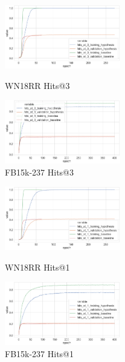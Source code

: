 \begin{figure}[H]
	\parbox{.5\linewidth}{
   		\centering
    		\includegraphics[width=0.45\textwidth, height=0.2\textheight]{WN18RR_hits_at_3_Results}
		\caption{WN18RR Hits@3}
		}
	\hfill
	\parbox{.5\linewidth}{
   		\centering
		\includegraphics[width=0.45\textwidth, height=0.2\textheight]{FB15k-237_hits_at_3_Results}
		\caption{FB15k-237 Hits@3}
		}
\end{figure}


\begin{figure}[H]
	\parbox{.5\linewidth}{
   		\centering
    		\includegraphics[width=0.45\textwidth, height=0.2\textheight]{WN18RR_hits_at_1_Results}
		\caption{WN18RR Hits@1}
		}
	\hfill
	\parbox{.5\linewidth}{
   		\centering
		\includegraphics[width=0.45\textwidth, height=0.2\textheight]{FB15k-237_hits_at_1_Results}
		\caption{FB15k-237 Hits@1}
		}
\end{figure}


